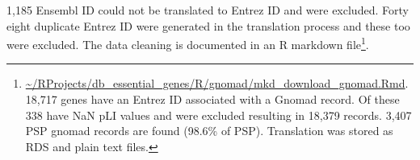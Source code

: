   1,185 Ensembl ID could not be translated to Entrez ID and were excluded. Forty eight duplicate Entrez ID were generated in the translation process and these too were excluded. The data cleaning is documented in an R markdown file\footnote{\url{~/RProjects/db_essential_genes/R/gnomad/mkd_download_gnomad.Rmd}. 18,717 genes have an Entrez ID associated with a Gnomad record. Of these 338 have NaN pLI values and were excluded resulting in 18,379 records. 3,407 PSP gnomad records are found (98.6\% of PSP). Translation was stored as RDS and plain text files. 

}.  %



















